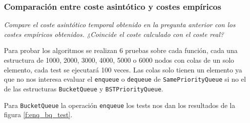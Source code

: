 \documentclass[a4paper, 12pt]{article}
\begin{document}
            \subsubsection{Comparación entre coste asintótico y costes empíricos}

                \textit{Compare el coste asintótico temporal obtenido en la 
                pregunta anterior con los costes empíricos obtenidos. ¿Coincide
                el coste calculado con el coste real?}
                \\\mbox{}

                Para probar los algoritmos se realizan 6 pruebas sobre cada 
                función, cada una estructura de 1000, 2000, 3000, 4000, 5000 o 
                6000 nodos con colas de un solo elemento, cada test se ejecutará
                100 veces. Las colas solo tienen un elemento ya que no nos 
                interesa evaluar el \texttt{enqueue} o \texttt{dequeue} de 
                \texttt{SamePriorityQueue} si no el de las estructuras 
                \texttt{BucketQueue} y \texttt{BSTPriorityQueue}. \\\mbox{}
                
                Para \texttt{BucketQueue} la operación \texttt{enqueue} los
                tests nos dan los resultados de la figura \ref{f:enq_bq_test}.
                \\\mbox{}
\end{document}
